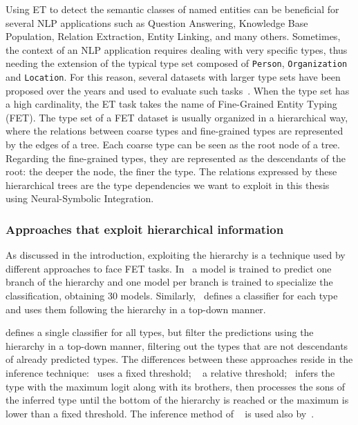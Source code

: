 Using ET to detect the semantic classes of named entities can be beneficial for several NLP applications such as Question Answering, Knowledge Base Population, Relation Extraction, Entity Linking, and many others. Sometimes, the context of an NLP application requires dealing with very specific types, thus needing the extension of the typical type set composed of \verb|Person|, \verb|Organization| and \verb|Location|. For this reason, several datasets with larger type sets have been proposed over the years and used to evaluate such tasks~\cite{Ling2012FineGrainedER, ren2016noise, choi, ontonotes}. When the type set has a high cardinality, the ET task takes the name of Fine-Grained Entity Typing (FET). The type set of a FET dataset is usually organized in a hierarchical way, where the relations between coarse types and fine-grained types are represented by the edges of a tree. Each coarse type can be seen as the root node of a tree. Regarding the fine-grained types, they are represented as the descendants of the root: the deeper the node, the finer the type. The relations expressed by these hierarchical trees are the type dependencies we want to exploit in this thesis using Neural-Symbolic Integration.

\subsubsection{Approaches that exploit hierarchical information}
As discussed in the introduction, exploiting the hierarchy is a technique used by different approaches to face FET tasks. In~\cite{rahman2010} a model is trained to predict one branch of the hierarchy and one model per branch is trained to specialize the classification, obtaining 30 models. Similarly,~\cite{yosef-etal-2012-hyena} defines a classifier for each type and uses them following the hierarchy in a top-down manner. 

\cite{yogatama-etal-2015-embedding,ma-etal-2016-label,ren-etal-2016-afet} defines a single classifier for all types, but filter the predictions using the hierarchy in a top-down manner, filtering out the types that are not descendants of already predicted types. The differences between these approaches reside in the inference technique:~\cite{yogatama-etal-2015-embedding} uses a fixed threshold; ~\cite{ma-etal-2016-label} a relative threshold;~\cite{ren-etal-2016-afet} infers the type with the maximum logit along with its brothers, then processes the sons of the inferred type until the bottom of the hierarchy is reached or the maximum is lower than a fixed threshold. The inference method of ~\cite{ren-etal-2016-afet} is used also by~\cite{abhishek-etal-2017-fine,ren2020FETHI}.

